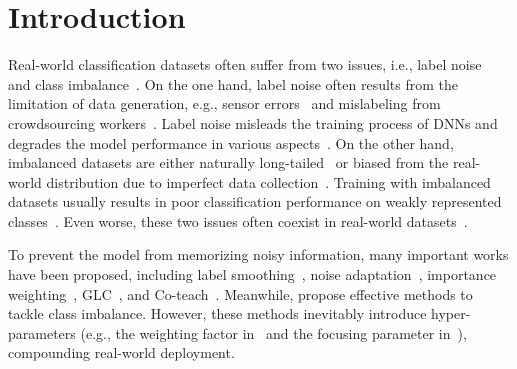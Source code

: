 \section{Introduction}
%
Real-world classification datasets often suffer from two issues, i.e., label noise~\cite{songLearningNoisyLabels2021} and class imbalance~\cite{heLearningImbalancedData2009}.
%
On the one hand, label noise often results from the limitation of data generation, e.g., sensor errors~\cite{elhadySystematicSurveySensor2018a} and mislabeling from crowdsourcing workers~\cite{tongxiaoLearningMassiveNoisy2015}.
%
Label noise misleads the training process of DNNs and degrades the model performance in various aspects~\cite{alganLabelNoiseTypes2020b,zhuClassNoiseVs2004a,frenayClassificationPresenceLabel2014a}.
%
On the other hand, imbalanced datasets are either naturally long-tailed~\cite{zhaoLongTailDistributionsUnsupervised2012a,vanhornDevilTailsFinegrained2017a} or biased from the real-world distribution due to imperfect data collection~\cite{pavonAssessingImpactClassImbalanced2011a,patelReviewClassificationImbalanced2020a}.
%
Training with imbalanced datasets usually results in poor classification performance on weakly represented classes~\cite{dongClassRectificationHard2017a,cuiClassBalancedLossBased2019,sinhaClassWiseDifficultyBalancedLoss2021a}.
%
Even worse, these two issues often coexist in real-world datasets~\cite{johnsonSurveyDeepLearning2019a}.

%
To prevent the model from memorizing noisy information, many important works have been proposed, including label smoothing~\cite{szegedyRethinkingInceptionArchitecture2016a}, noise adaptation~\cite{goldbergerTrainingDeepNeuralnetworks2017}, importance weighting~\cite{liuClassificationNoisyLabels2014}, GLC~\cite{hendrycksUsingTrustedData2018}, and Co-teach~\cite{hanCoteachingRobustTraining2018a}.
%
Meanwhile, \cite{dongClassRectificationHard2017a,cuiClassBalancedLossBased2019,sinhaClassWiseDifficultyBalancedLoss2021a,linFocalLossDense2020} propose effective methods to tackle class imbalance.
% 
However, these methods inevitably introduce hyper-parameters (e.g., the weighting factor in~\cite{cuiClassBalancedLossBased2019} and the focusing parameter in~\cite{linFocalLossDense2020}), compounding real-world deployment.

